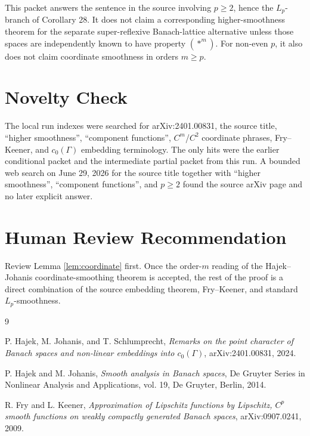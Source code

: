 \documentclass[11pt]{article}
\begin{document}
This packet answers the sentence in the source involving \(p\ge2\), hence the
\(L_p\)-branch of Corollary 28.  It does not claim a corresponding
higher-smoothness theorem for the separate super-reflexive Banach-lattice
alternative unless those spaces are independently known to have property
\((\ast^m)\).  For non-even \(p\), it also does not claim coordinate
smoothness in orders \(m\ge p\).

\section*{Novelty Check}

The local run indexes were searched for arXiv:2401.00831, the source title,
``higher smoothness'', ``component functions'', \(C^m\)/\(C^2\) coordinate
phrases, Fry--Keener, and \(c_0(\Gamma)\) embedding terminology.  The only
hits were the earlier conditional packet and the intermediate partial packet
from this run.  A bounded web search on June 29, 2026 for the source title
together with ``higher smoothness'', ``component functions'', and \(p\ge2\)
found the source arXiv page and no later explicit answer.

\section*{Human Review Recommendation}

Review Lemma \ref{lem:coordinate} first.  Once the order-\(m\) reading of the
Hajek--Johanis coordinate-smoothing theorem is accepted, the rest of the proof
is a direct combination of the source embedding theorem, Fry--Keener, and
standard \(L_p\)-smoothness.

\begin{thebibliography}{9}

P. Hajek, M. Johanis, and T. Schlumprecht,
\emph{Remarks on the point character of Banach spaces and non-linear
embeddings into \(c_0(\Gamma)\)},
arXiv:2401.00831, 2024.

P. Hajek and M. Johanis,
\emph{Smooth analysis in Banach spaces},
De Gruyter Series in Nonlinear Analysis and Applications, vol. 19,
De Gruyter, Berlin, 2014.

R. Fry and L. Keener,
\emph{Approximation of Lipschitz functions by Lipschitz, \(C^p\) smooth
functions on weakly compactly generated Banach spaces},
arXiv:0907.0241, 2009.

\end{thebibliography}
\end{document}
